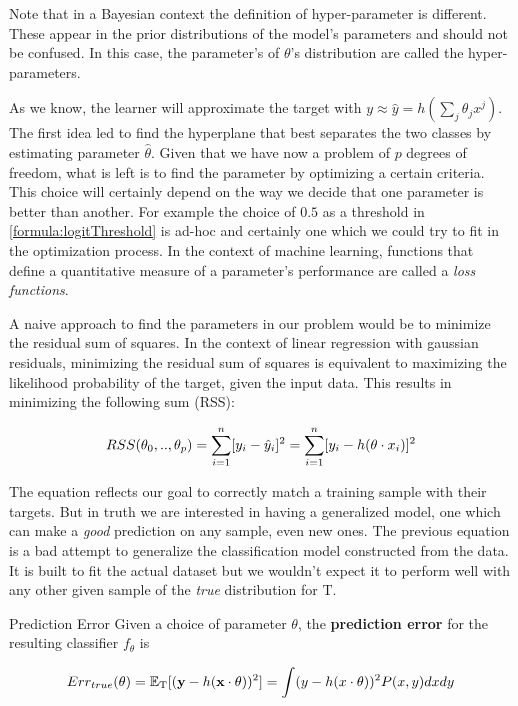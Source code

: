 Note that in a Bayesian context the definition of hyper-parameter is different. These appear in the  prior distributions of the model's parameters and should not be confused. In this case, the parameter's of $\theta$'s distribution are called the hyper-parameters.


\textit{}


As we know, the learner will approximate the target with $y \approx \hat{y} = h\left(\sum_{j}\theta_j x^j\right)$. The first idea led to find the hyperplane that best separates the two classes by estimating parameter $\hat{\theta}$. Given that we have now a problem of $p$ degrees of freedom, what is left is to find the parameter by optimizing a certain criteria. This choice will certainly depend on the way we decide that one parameter is better than another. For example the choice of $0.5$ as a threshold in \ref{formula:logitThreshold} is ad-hoc and certainly one which we could try to fit in the optimization process. In the context of machine learning, functions that define a quantitative measure of a parameter's performance  are called a \textit{loss functions}.

A naive approach to find the parameters in our problem would be to minimize the residual sum of squares. In the context of linear regression with gaussian residuals, minimizing the residual sum of squares is equivalent to maximizing the likelihood probability of the target, given the input data. This results in minimizing the following sum (RSS):

\begin{equation} \label{eq:rss}
RSS(\theta_0,..,\theta_p)  = \sum_{i=1}^n [y_i - \hat{y}_i]^2  \\
=  \sum_{i=1}^n [y_i - h( \theta \cdot x_i)]^2
\end{equation}

The equation reflects our goal to correctly match a training sample with their targets. But in truth we are interested in having a generalized model, one which can make a \textit{good} prediction on any sample, even new ones. The previous equation is a bad attempt to generalize the classification model constructed from the data. It is built to fit the actual dataset but we wouldn't expect it to perform well with any other given sample of the \textit{true} distribution for $\mathrm{T}$.

\begin{definition}{Prediction Error}
Given a choice of parameter $\theta$, the \textbf{prediction error} for the resulting classifier $f_\theta$ is

\begin{equation}
    Err_{true}(\theta)  = \operatorname{\mathbb{E}}_{ \mathrm{T}}[(\textbf{y} - h(\textbf{x} \cdot \theta) )^2] \\
    = \int (y - h(x \cdot \theta) )^2 P(x,y)dxdy
\end{equation}

\end{definition}

